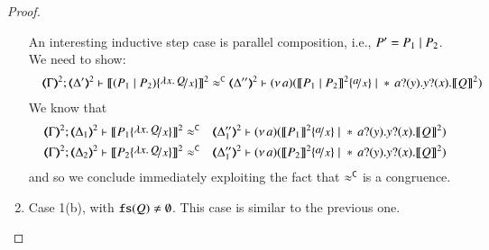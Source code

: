 \begin{proof}
\begin{enumerate}[1.]
	\noi An interesting inductive step case is parallel composition, i.e., $P' = P_1 \;|\; P_2$. We need to show:
%
	\begin{eqnarray*}
		&& \tmap{\Gamma}{2};   \tmap{\Delta'}{2} \proves \pmap{(P_1 \Par P_2) \subst{\abs{x}{Q}}{x}}{2} \fwb
		\tmap{\Delta''}{2} \proves \newsp{a}{\pmap{P_1 \Par P_2}{2} \subst{a}{x} \Par \repl{} \binp{a}{y} \binp{y}{x} \pmap{Q}{2}}
	\end{eqnarray*}
%
	\noi We know that
%
	\begin{eqnarray*}
		\horel{\tmap{\Gamma}{2}}{\tmap{\Delta_1}{2}}{\pmap{P_1\subst{\abs{x}{Q}}{x}}{2}}{&\fwb&}
		{\tmap{\Delta_1''}{2}}{\newsp{a}{\pmap{P_1}{2} \subst{a}{x} \Par \repl{} \binp{a}{y} \binp{y}{x} \pmap{Q}{2}}}\\
		\horel{\tmap{\Gamma}{2}}{\tmap{\Delta_2}{2}}{\pmap{P_2\subst{\abs{x}{Q}}{x}}{2}}{&\fwb&}
		{\tmap{\Delta_1''}{2}}{\newsp{a}{\pmap{P_2}{2} \subst{a}{x} \Par \repl{} \binp{a}{y} \binp{y}{x} \pmap{Q}{2}}}
	\end{eqnarray*}
%
	\noi and so we conclude immediately exploiting the fact that $\approx^\mathtt{C}$ is a congruence.

	\item Case 1(b), with $\mathtt{fs}(Q) \neq  \emptyset$. This case is similar to the previous one.
	\end{enumerate}

%
%
\end{proof}

